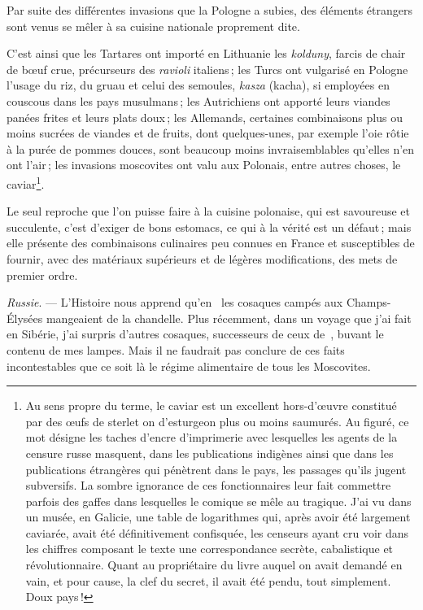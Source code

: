 Par suite des différentes invasions que la Pologne a subies, des éléments
étrangers sont venus se mêler à sa cuisine nationale proprement dite.

C'est ainsi que les Tartares ont importé en Lithuanie les \textit{kolduny},
farcis de chair de bœuf crue, précurseurs des \textit{ravioli} italiens ; les
Turcs ont vulgarisé en Pologne l'usage du riz, du gruau et celui des semoules,
\textit{kasza} (kacha), si employées en couscous dans les pays musulmans ; les
Autrichiens ont apporté leurs viandes panées frites et leurs plats doux ; les
Allemands, certaines combinaisons plus ou moins sucrées de viandes et de
fruits, dont quelques-unes, par exemple l'oie rôtie à la purée de pommes
douces, sont beaucoup moins invraisemblables qu'elles n'en ont l'air ; les
invasions moscovites ont valu aux Polonais, entre autres choses, le
caviar\footnote{Au sens propre du terme, le caviar est un excellent
hors-d'œuvre constitué par des œufs de sterlet on d'esturgeon plus ou moins
saumurés. Au figuré, ce mot désigne les taches d'encre d'imprimerie avec
lesquelles les agents de la censure russe masquent, dans les publications
indigènes ainsi que dans les publications étrangères qui pénètrent dans le
pays, les passages qu'ils jugent subversifs. La sombre ignorance de ces
fonctionnaires leur fait commettre parfois des gaffes dans lesquelles le
comique se mêle au tragique. J'ai vu dans un musée, en Galicie, une table de
logarithmes qui, après avoir été largement caviarée, avait été définitivement
confisquée, les censeurs ayant cru voir dans les chiffres composant le texte
une correspondance secrète, cabalistique et révolutionnaire. Quant au
propriétaire du livre auquel on avait demandé en vain, et pour cause, la clef
du secret, il avait été pendu, tout simplement. Doux pays !}.
  
Le seul reproche que l’on puisse faire à la cuisine polonaise, qui est
savoureuse et succulente, c'est d'exiger de bons estomacs, ce qui à la vérité
est un défaut ; mais elle présente des combinaisons culinaires peu connues en
France et susceptibles de fournir, avec des matériaux supérieurs et de légères
modifications, des mets de premier ordre.

\textit{Russie}. — L'Histoire nous apprend qu'en {\mmm} {\mmm} les
cosaques campés aux Champs-Élysées mangeaient de la chandelle. Plus récemment,
dans un voyage que j'ai fait en Sibérie, j'ai surpris d'autres cosaques,
successeurs de ceux de {\mmm} {\mmm}, buvant le contenu de mes
lampes. Mais il ne faudrait pas conclure de ces faits incontestables que ce
soit là le régime alimentaire de tous les Moscovites.

